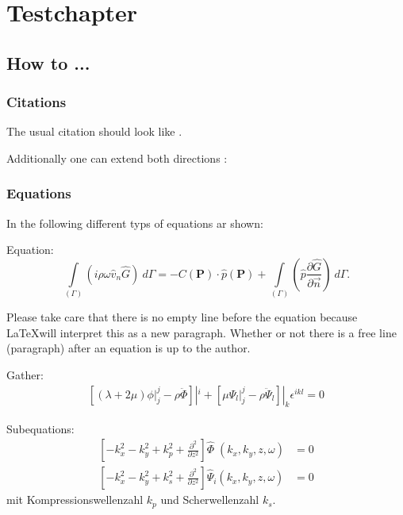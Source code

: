 \chapter{Testchapter}
\label{cha:beispiele}

\section{How to ...}
\label{sec:chief}

\subsection{Citations}
\label{sec:citations}
The usual citation should look like \citep{Stroud1966}.

Additionally one can extend both directions \citep[before][after p.1-3]{Stroud1966}: 
\citep{Unknown2018}

\citep{Unknown2018}

\citep{Hackenberg2016}

\cite{Fruehe2010}


\subsection{Equations}
\label{sec:equations}
In the following different typs of equations ar shown:

Equation:
%
\begin{equation}
		\int\limits_{(\Gamma)} \left( i \rho \omega \hat{v}_{n} \hat{G}\right)~d\Gamma  = - C(\mathbf{P}) \cdot \hat{p}(\mathbf{P})  + \int\limits_{(\Gamma)} \left(\hat{p} \frac{\partial \hat{G}}{\partial \vec{n}}\right)~d\Gamma.
	\label{eq:chief1}
\end{equation}

Please take care that there is no empty line before the equation because \LaTeX will interpret this as a new paragraph. Whether or not there is a free line (paragraph) after an equation is up to the author.

Gather:
\begin{gather}
\left[(\lambda+2\mu)\phi|^j_j-\rho\ddot{\Phi}\right]|^i+\left[\mu\Psi_l|_j^j-\rho\ddot{\Psi}_l\right]|_k\epsilon^{ikl}=0
\end{gather}

Subequations:
\begin{subequations}\label{eq:Wellengleichung_FT}
\begin{align}
		 \left[-k_x^2 - k_y^2 + k_p^2 +\frac{\partial ^2}{\partial z^2}\right]\hat{\Phi} \;(k_x,k_y,z,\omega) &= 0 \label{eq:2.5}\\[10pt]
		 \left[-k_x^2 - k_y^2 + k_s^2 +\frac{\partial ^2}{\partial z^2}\right]\hat{\Psi}_i(k_x,k_y,z,\omega) &= 0 \label{eq:2.6}
\end{align}
\end{subequations}
mit Kompressionswellenzahl $k_p$ und Scherwellenzahl $k_s$.

